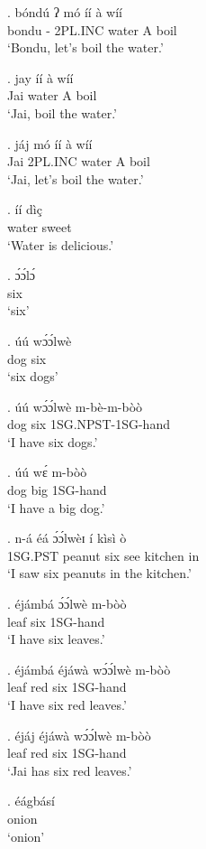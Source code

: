 \documentclass{assets/fieldnotes}
\begin{document}
\exg.  bóndú ʔ mó íí à wíí \\
bondu - 2PL.INC water A boil \\
`Bondu, let's boil the water.'

\exg. jay íí à wíí\\
Jai water A boil \\
`Jai, boil the water.'


\exg. jáj mó íí à wíí \\
Jai 2PL.INC water A boil \\
`Jai, let's boil the water.'

\exg. íí dìç\\
water sweet \\
`Water is delicious.'


\exg. ɔ́ɔ́lɔ́\\ 
six\\
`six'

\exg. úú wɔ́ɔ́lwè \\
dog six \\
`six dogs'

\exg. úú wɔ́ɔ́lwè m-bè-m-bòò \\
dog six 1SG.NPST-1SG-hand\\
`I have six dogs.'

\exg. úú wɛ́ m-bòò\\
dog big 1SG-hand\\
`I have a big dog.'

\exg. n-á éá ɔ́ɔ́lwèɪ í kìsì ò\\
1SG.PST peanut six see kitchen in\\
`I saw six peanuts in the kitchen.'

\exg. éjámbá ɔ́ɔ́lwè m-bòò\\
leaf six 1SG-hand \\
`I have six leaves.'

\exg. éjámbá éjáwà wɔ́ɔ́lwè m-bòò\\
leaf red six 1SG-hand \\
`I have six red leaves.'

\exg. éjáj   éjáwà wɔ́ɔ́lwè m-bòò\\
leaf red six 1SG-hand \\
`Jai has six red leaves.'

\exg. éágbásí\\
onion\\
`onion'
\end{document}
